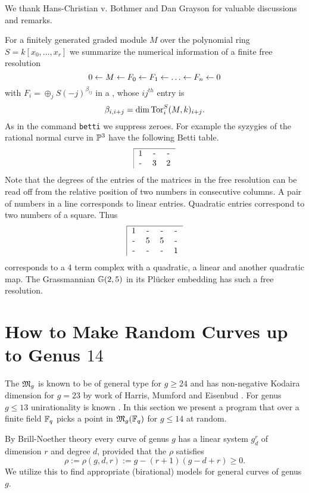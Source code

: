 \begin{acknowledgment} 
We thank Hans-Christian v. Bothmer and Dan Gray\-son for valuable discussions and
remarks. 
\end{acknowledgment} 


For a finitely generated graded module $M$ over the polynomial ring 
$S=k[x_0,\ldots,x_r]$ we summarize the numerical information of a finite
free resolution
$$ 0 \leftarrow M \leftarrow F_0 \leftarrow F_1 \leftarrow \ldots \leftarrow F_n\leftarrow 0 $$
with $F_i = \oplus_j S(-j)^{\beta_{ij}}$ in a ,
whose $ij^{th}$ entry is
$$ \beta_{i,i+j} = \dim {\rm{Tor}}_i^S(M,k)_{i+j}.$$
As in the \Mtwo command {\tt betti} we suppress zeroes.
For example the syzygies of the rational normal curve in ${\mathbb P}^3$ 
have the following Betti table.
$$\begin{tabular}{|ccc}
\hline
1 & - & - \cr
- & 3 & 2 \cr
\end{tabular}$$
Note that the degrees of the entries of the matrices in the free
resolution can be read off from the relative position of two numbers in 
consecutive columns. A pair of numbers in a line corresponds to linear entries.
Quadratic entries correspond to two numbers of a square. Thus 
$$\begin{tabular}{|cccc}
\hline
1 & - & - & - \cr
- & 5 & 5 & - \cr 
- & - & - & 1 \cr
\end{tabular}$$
corresponds to a 4 term complex with a quadratic, a linear and another
quadratic map. The Grassmannian ${\mathbb G}(2,5)$ in its Pl\"ucker embedding
has such a free resolution.
 


 

\section{How to Make Random Curves up to Genus $14$}

The  $\mathfrak M_g$ is known to be of general type for 
$g \ge 24$ and has non-negative Kodaira dimension for $g=23$ by work of 
Harris, Mumford and Eisenbud \cite{CO:HM,CO:EH}. 
For genus $g \le 13  $ unirationality is known \cite{CO:CR,CO:Se}.
In this section we present a \Mtwo program that over a finite field ${\mathbb F}_q$ 
picks a point in $\mathfrak M_g({\mathbb F}_q)$  for $g \le 14$ at random. 

By Brill-Noether theory \cite{CO:ACGH} every curve of genus $g$ has a linear 
system $g^r_d$ of dimension $r$ and degree $d$, provided that the 
$\rho$ satisfies
$$\rho := \rho(g,d,r) := g-(r+1)(g-d+r)\geq 0.$$
We utilize this to find appropriate (birational) models for general curves of genus $g$.



